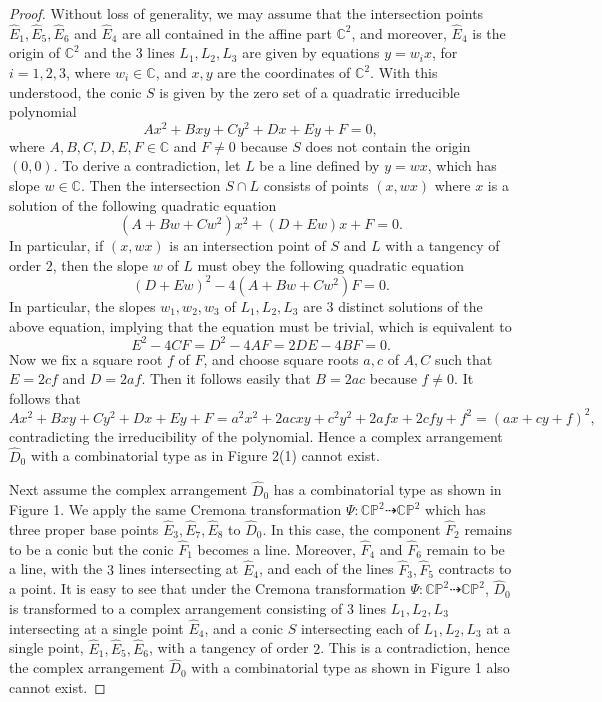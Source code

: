 \documentclass[11pt]{amsart}
\theoremstyle{plain}
\numberwithin{theorem}{section}
\theoremstyle{definition}
\newcommand{\C}{{\mathbb C}}
\renewcommand{\P}{{\mathbb P}}
\begin{document}
\begin{proof}
Without loss of generality, we may assume that the intersection points  $\hat{E}_1,\hat{E}_5,\hat{E}_6$ and
$\hat{E}_4$ are all contained in the affine part $\C^2$, and moreover, $\hat{E}_4$ is the origin of  $\C^2$ and
the $3$ lines $L_1,L_2,L_3$ are given by equations $y=w_i x$, for $i=1,2,3$, where $w_i\in\C$, and $x,y$ are the coordinates of $\C^2$. With this understood, the conic $S$ is given by the zero set of a quadratic irreducible polynomial 
$$
Ax^2+Bxy+Cy^2+Dx+Ey+F=0,
$$
where $A,B,C,D,E,F\in\C$ and $F\neq 0$ because $S$ does not contain the origin $(0,0)$. To derive a contradiction, let $L$ be a line defined by $y=wx$, which has slope $w\in \C$. Then the intersection $S\cap L$
consists of points $(x,wx)$ where $x$ is a solution of the following quadratic equation
$$
(A+Bw+Cw^2)x^2+ (D+Ew)x +F=0. 
$$
In particular, if $(x,wx)$ is an intersection point of $S$ and $L$ with a tangency of order $2$, then the slope $w$
of $L$ must obey the following quadratic equation
$$
(D+Ew)^2-4(A+Bw+Cw^2)F=0. 
$$
In particular, the slopes $w_1,w_2,w_3$ of $L_1,L_2,L_3$ are $3$ distinct solutions of the above equation,
implying that the equation must be trivial, which is equivalent to 
$$
E^2-4CF=D^2-4AF=2DE-4BF=0. 
$$
Now we fix a square root $f$ of $F$, and choose square roots $a,c$ of $A,C$ such that $E=2cf$ and $D=2af$.
Then it follows easily that $B=2ac$ because $f\neq 0$. It follows that
$$
Ax^2+Bxy+Cy^2+Dx+Ey+F=a^2x^2+2acxy+c^2y^2+2afx+2cfy+f^2=(ax+cy+f)^2,
$$
contradicting the irreducibility of the polynomial. Hence a complex arrangement $\hat{D}_0$ 
with a combinatorial type as in Figure 2(1) cannot exist. 

Next assume the complex arrangement $\hat{D}_0$ has a combinatorial type as shown in Figure 1. We 
apply the same Cremona transformation $\Psi: \C\P^2\dashrightarrow \C\P^2$ which has three proper base 
points $\hat{E}_3, \hat{E}_7,\hat{E}_8$ to $\hat{D}_0$. In this case, the component $\hat{F}_2$ remains to 
be a conic but the conic $\hat{F}_1$ becomes a line. Moreover, $\hat{F}_4$ and $\hat{F}_6$ remain to be a line, with the $3$ lines intersecting at $\hat{E}_4$, and each of the lines $\hat{F}_3,\hat{F}_5$ contracts to a point.
It is easy to see that under the Cremona transformation $\Psi: \C\P^2\dashrightarrow \C\P^2$, $\hat{D}_0$ is transformed to a complex arrangement consisting of $3$ lines $L_1,L_2,L_3$ intersecting at a single point 
$\hat{E}_4$, and a conic $S$ intersecting each of $L_1,L_2,L_3$ at a single point, 
$\hat{E}_1,\hat{E}_5,\hat{E}_6$, with a tangency of order $2$. This is a contradiction, hence the complex arrangement $\hat{D}_0$ with a combinatorial type as shown in Figure 1 also cannot exist. 


\end{proof}
\end{document}
